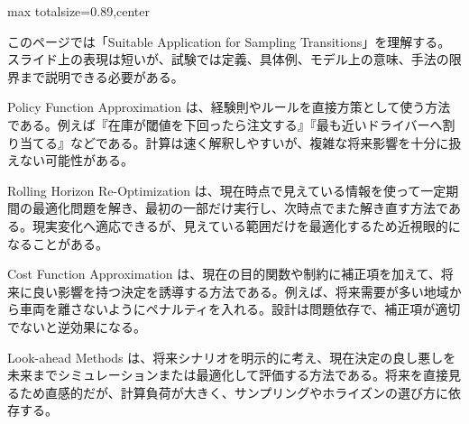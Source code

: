 \begin{minipage}[t]{0.58\textwidth}
\begin{adjustbox}{max totalsize={\textwidth}{0.89\textheight},center}
\begin{minipage}{\textwidth}\scriptsize
{}このページでは「Suitable Application for Sampling Transitions」を理解する。スライド上の表現は短いが、試験では定義、具体例、モデル上の意味、手法の限界まで説明できる必要がある。\par
Policy Function Approximation は、経験則やルールを直接方策として使う方法である。例えば『在庫が閾値を下回ったら注文する』『最も近いドライバーへ割り当てる』などである。計算は速く解釈しやすいが、複雑な将来影響を十分に扱えない可能性がある。\par
Rolling Horizon Re-Optimization は、現在時点で見えている情報を使って一定期間の最適化問題を解き、最初の一部だけ実行し、次時点でまた解き直す方法である。現実変化へ適応できるが、見えている範囲だけを最適化するため近視眼的になることがある。\par
Cost Function Approximation は、現在の目的関数や制約に補正項を加えて、将来に良い影響を持つ決定を誘導する方法である。例えば、将来需要が多い地域から車両を離さないようにペナルティを入れる。設計は問題依存で、補正項が適切でないと逆効果になる。\par
Look-ahead Methods は、将来シナリオを明示的に考え、現在決定の良し悪しを未来までシミュレーションまたは最適化して評価する方法である。将来を直接見るため直感的だが、計算負荷が大きく、サンプリングやホライズンの選び方に依存する。\par

\end{minipage}
\end{adjustbox}
\end{minipage}
